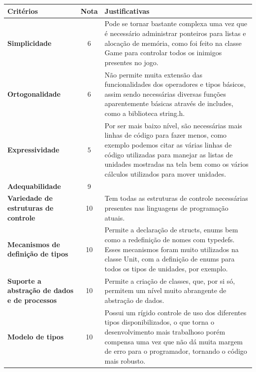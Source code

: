 \documentclass[rel_mlp]{iiufrgs}
\begin{document}
 \begin{center}
\begin{tabular}{ |p{40mm}|c|p{80mm}| }
\hline
	\textbf{Critérios} & \textbf{Nota} & \textbf{Justificativas} \\
\hline
\textbf{Simplicidade} & 6 & Pode se tornar bastante complexa uma vez que é necessário administrar ponteiros para listas e alocação de memória, como foi feito na classe Game para controlar todos os inimigos presentes no jogo.\\
\textbf{Ortogonalidade} & 6 & Não permite muita extensão das funcionalidades dos operadores e tipos básicos, assim sendo necessárias diversas funções aparentemente básicas através de includes, como a biblioteca string.h.\\
\textbf{Expressividade} & 5 & Por ser mais baixo nível, são necessárias mais linhas de código para fazer menos, como exemplo podemos citar as várias linhas de código utilizadas para manejar as listas de unidades mostradas na tela bem como os vários cálculos utilizados para mover unidades. \\
\textbf{Adequabilidade} & 9 &  \\
\textbf{Variedade de estruturas de controle} & 10 & Tem todas as estruturas de controle necessárias presentes nas linguagens de programação atuais. \\
\textbf{Mecanismos de definição de tipos} & 10 & Permite a declaração de structs, enums bem como a redefinição de nomes com typedefs. Esses mecanismos foram muito utilizados na classe Unit, com a definição de enums para todos os tipos de unidades, por exemplo.\\
\textbf{Suporte a abstração de dados e de processos} & 10 & Permite a criação de classes, que, por si só, permitem um nível muito abrangente de abstração de dados. \\
\textbf{Modelo de tipos} & 10 & Possui um rígido controle de uso dos diferentes tipos disponibilizados, o que torna o desenvolvimento mais trabalhoso porém compensa uma vez que não dá muita margem de erro para o programador, tornando o código mais robusto.\\
\hline
\end{tabular}
\end{center}
\end{document}

